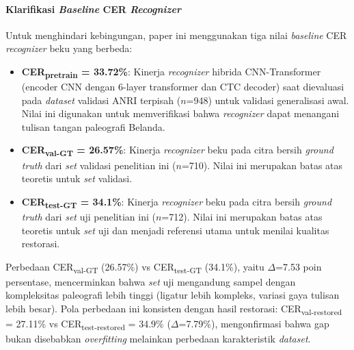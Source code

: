 \documentclass[journal]{IEEEtran}
\begin{document}
\paragraph{Klarifikasi \textit{Baseline} CER \textit{Recognizer}} Untuk menghindari kebingungan, paper ini menggunakan tiga nilai \textit{baseline} CER \textit{recognizer} beku yang berbeda:\vspace{-0.5em}
\begin{itemize}[itemsep=0pt]
    \item \textbf{CER\textsubscript{pretrain} = 33.72\%}: Kinerja \textit{recognizer} hibrida CNN-Transformer (encoder CNN dengan 6-layer transformer dan CTC decoder) saat dievaluasi pada \textit{dataset} validasi ANRI terpisah ($n$=948) untuk validasi generalisasi awal. Nilai ini digunakan untuk memverifikasi bahwa \textit{recognizer} dapat menangani tulisan tangan paleografi Belanda.
    \item \textbf{CER\textsubscript{val-GT} = 26.57\%}: Kinerja \textit{recognizer} beku pada citra bersih \textit{ground truth} dari \textit{set} validasi penelitian ini ($n$=710). Nilai ini merupakan batas atas teoretis untuk \textit{set} validasi.
    \item \textbf{CER\textsubscript{test-GT} = 34.1\%}: Kinerja \textit{recognizer} beku pada citra bersih \textit{ground truth} dari \textit{set} uji penelitian ini ($n$=712). Nilai ini merupakan batas atas teoretis untuk \textit{set} uji dan menjadi referensi utama untuk menilai kualitas restorasi.
\end{itemize}
\vspace{0.5em}
Perbedaan CER\textsubscript{val-GT} (26.57\%) vs CER\textsubscript{test-GT} (34.1\%), yaitu $\Delta$=7.53 poin persentase, mencerminkan bahwa \textit{set} uji mengandung sampel dengan kompleksitas paleografi lebih tinggi (ligatur lebih kompleks, variasi gaya tulisan lebih besar). Pola perbedaan ini konsisten dengan hasil restorasi: CER\textsubscript{val-restored} = 27.11\% vs CER\textsubscript{test-restored} = 34.9\% ($\Delta$=7.79\%), mengonfirmasi bahwa gap bukan disebabkan \textit{overfitting} melainkan perbedaan karakteristik \textit{dataset}.
\end{document}
